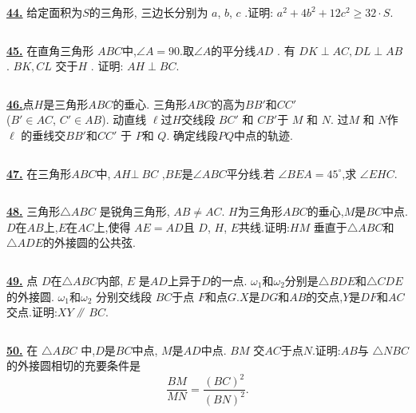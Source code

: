 \documentclass{article}
\newcommand\pxx{%
\mathrel{\text{\tikz[baseline] \draw (0em,-0.3ex) -- (.4em,1.7ex) (.2em,-0.3ex) -- (.6em,1.7ex);}%
}}
\begin{document}
$$ $$

\href{http://www.artofproblemsolving.com/Forum/viewtopic.php?p=443384#p443384
 }{\bf 44.} 给定面积为$S$的三角形, 三边长分别为 $a$, $b$, $c$ .证明: $a^{2}+4b^{2}+12c^{2}\geq 32\cdot S$.


$$ $$


\href{http://www.artofproblemsolving.com/Forum/viewtopic.php?p=431965#p431965
 }{\bf 45.} 在直角三角形 $ABC$中,$\angle A = 90$.取$\angle A$的平分线$AD$ . 有 $DK \perp AC , DL \perp AB$ . $BK , CL$ 交于$H$ .  证明: $AH \perp BC$.

$$ $$



\href{ http://www.artofproblemsolving.com/Forum/viewtopic.php?p=181685#p181685
}{\bf 46.}点$H$是三角形$ABC$的垂心. 三角形$ABC$的高为$BB'$和$CC'$\\($B' \in AC$, $C' \in AB$). 动直线 $\ell$过$H$交线段 $BC'$ 和 $CB'$于 $M$ 和 $N$.  过$M$ 和 $N$作$\ell$ 的垂线交$BB'$和$CC'$ 于 $P$和 $Q$. 确定线段$ PQ$中点的轨迹.


$$ $$


\href{ http://www.artofproblemsolving.com/Forum/viewtopic.php?p=584865#p584865
}{\bf 47.} 在三角形$ABC$中,$\ AH\bot\ BC$ ,$ BE$是$\angle ABC$平分线.若 $\angle BEA=45^{\circ}$,求 $\angle EHC.$


$$ $$


\href{ http://www.artofproblemsolving.com/Forum/viewtopic.php?p=519896#p519896
}{\bf 48.} 三角形$\triangle ABC$ 是锐角三角形, $AB \not= AC$.  $H$为三角形$ABC$的垂心,$M$是$BC$中点.$D$在$AB$上,$E$在$AC$上,使得 $AE=AD$且 $D$, $H$, $E$共线.证明:$HM$ 垂直于$\triangle ABC$和$\triangle ADE$的外接圆的公共弦.


$$ $$


\href{ http://www.artofproblemsolving.com/Forum/viewtopic.php?p=519895#p519895
}{\bf 49.} 点 $D$在$\triangle ABC$内部, $E$ 是$AD$上异于$D$的一点. $\omega_1$和$\omega_2$分别是$\triangle BDE$和$\triangle CDE$的外接圆. $\omega_1$和$\omega_2$ 分别交线段 $BC$于点 $F$和点$G$.$X$是$DG$和$AB$的交点,$Y$是$DF$和$AC$交点.证明:$XY$ $\pxx$ $BC$.


$$ $$


\href{ http://www.artofproblemsolving.com/Forum/viewtopic.php?p=493656#p493656
}{\bf 50.} 在 $\triangle{ABC}$ 中,$D$是$BC$中点, $M$是$AD$中点. $BM$ 交$AC$于点$N$.证明:$AB$与 $\triangle{NBC}$的外接圆相切的充要条件是
$$\frac{{BM}}{{MN}} =\frac{({BC})^2}{({BN})^2}.$$
\end{document}
